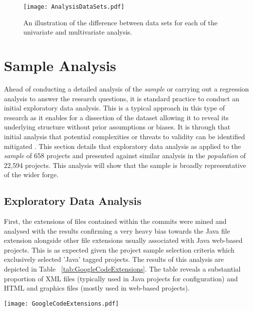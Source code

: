 \begin{figure}[htbp!] 
\centering    
\texttt{[image: AnalysisDataSets.pdf]}
\caption{An illustration of the difference between data sets for each of the univariate and multivariate analysis.}
\label{fig:AnalysisDataSets}
\end{figure}

\section{Sample Analysis} %
Ahead of conducting a detailed analysis of the \textit{sample} or carrying out a regression analysis to answer the research questions, it is standard practice to conduct an initial exploratory data analysis. This is a typical approach in this type of research  \citep{grechanik2010empirical, cartwright2000empirical} as it enables for a dissection of the dataset allowing it to reveal its underlying structure without prior assumptions or biases. It is through that initial analysis that potential complexities or threats to validity can be identified mitigated \citep{tukey1977exploratory}. This section details that exploratory data analysis as applied to the \textit{sample} of 658 projects and presented against similar analysis in the \textit{population} of 22,594 projects. This analysis will show that the sample is broadly representative of the wider forge.

\subsection{Exploratory Data Analysis}
First, the extensions of files contained within the commits were mined and analysed with the results confirming a very heavy bias towards the Java file extension alongside other file extensions usually associated with Java web-based projects. This is as expected given the project sample selection criteria which exclusively selected 'Java' tagged projects. The results of this analysis are depicted in Table ~\ref{tab:GoogleCodeExtensions}. The table reveals a substantial proportion of XML files (typically used in Java projects  for configuration) and HTML and graphics files (mostly used in web-based projects).

\begin{table}
\centering 
{}
\begin{tabular}
 \centering 
 \texttt{[image: GoogleCodeExtensions.pdf]}
 \label{tab:GoogleCodeExtensions}
\end{tabular}
\end{table}

